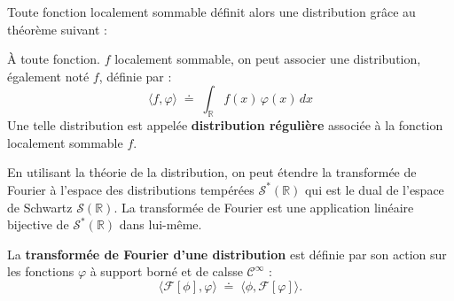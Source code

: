 Toute fonction localement sommable définit alors une distribution grâce au théorème suivant :

\begin{Theo} À toute fonction. $f$ localement sommable, on peut associer une distribution, également noté $f$, définie par :
\begin{equation}
    \langle f , \varphi \rangle 
    \;\doteq\;
    \int_{\mathbb R} f(x)\,\varphi(x)\,dx
    \tag*{$\forall\,\varphi \in \mathcal T.$}
\end{equation}
Une telle distribution est appelée {\bf distribution régulière} associée à la fonction localement sommable $f$.
\end{Theo} 

\smallskip

En utilisant la théorie de la distribution, on peut étendre la transformée de Fourier à l'espace des distributions tempérées $\mathcal{S}^\ast(\mathbb{R})$ qui est le dual de l'espace de Schwartz $\mathcal{S}(\mathbb{R})$. La transformée de Fourier est une application linéaire bijective de $\mathcal{S}^\ast(\mathbb{R})$ dans lui-même.

\begin{Defi} 
    La {\bf transformée de Fourier d'une distribution \bm{$\phi$}}  est définie par son action sur les fonctions $\varphi$ à support borné et de calsse $\mathcal C^\infty$ :
    \begin{equation}
        \langle \mathcal F[\phi] , \varphi \rangle \; \doteq \; \langle \phi , \mathcal F[\varphi] \rangle.
    \end{equation}
\end{Defi}

